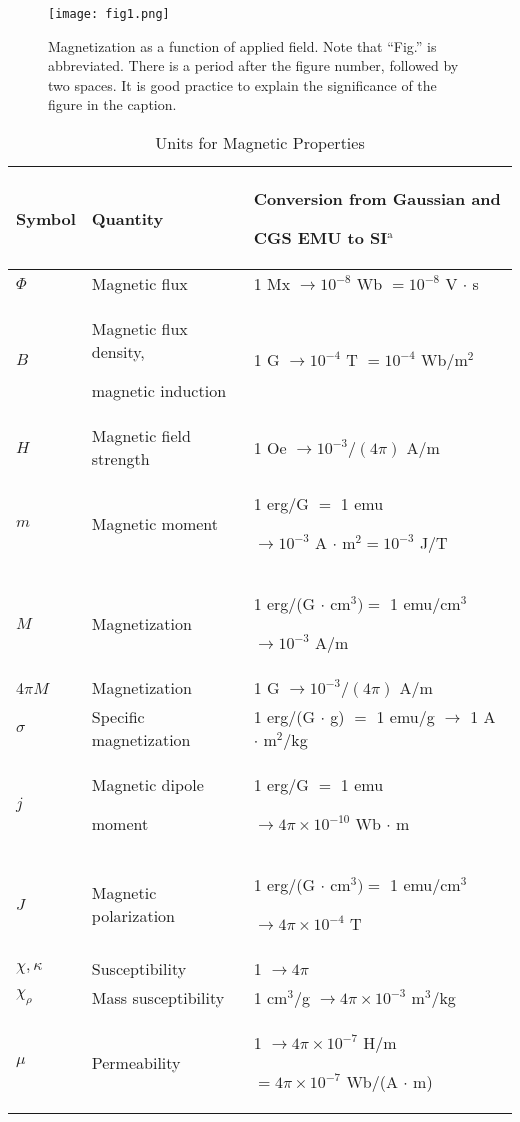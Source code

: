 \begin{figure}
\centerline{\texttt{[image: fig1.png]}}
\caption{Magnetization as a function of applied field. Note that ``Fig.'' is abbreviated. There is a period after the figure number, followed by two spaces. It is good practice to explain the significance of the figure in the caption.}
\end{figure}

\begin{table}
\caption{Units for Magnetic Properties}
\label{table}
\small
\setlength{\tabcolsep}{3pt}
\begin{tabular}{|p{25pt}|p{75pt}|p{110pt}|}
\hline
Symbol& 
Quantity& 
Conversion from Gaussian and \par CGS EMU to SI$^{\mathrm{a}}$ \\
\hline
$\Phi $& 
Magnetic flux& 
1 Mx $\to  10^{-8}$ Wb $= 10^{-8}$ V $\cdot$ s \\
$B$& 
Magnetic flux density, \par magnetic induction& 
1 G $\to  10^{-4}$ T $= 10^{-4}$ Wb/m$^{2}$ \\
$H$& 
Magnetic field strength& 
1 Oe $\to  10^{-3}/(4\pi )$ A/m \\
$m$& 
Magnetic moment& 
1 erg/G $=$ 1 emu \par $\to 10^{-3}$ A $\cdot$ m$^{2} = 10^{-3}$ J/T \\
$M$& 
Magnetization& 
1 erg/(G $\cdot$ cm$^{3}) =$ 1 emu/cm$^{3}$ \par $\to 10^{-3}$ A/m \\
4$\pi M$& 
Magnetization& 
1 G $\to  10^{-3}/(4\pi )$ A/m \\
$\sigma $& 
Specific magnetization& 
1 erg/(G $\cdot$ g) $=$ 1 emu/g $\to $ 1 A $\cdot$ m$^{2}$/kg \\
$j$& 
Magnetic dipole \par moment& 
1 erg/G $=$ 1 emu \par $\to 4\pi \times  10^{-10}$ Wb $\cdot$ m \\
$J$& 
Magnetic polarization& 
1 erg/(G $\cdot$ cm$^{3}) =$ 1 emu/cm$^{3}$ \par $\to 4\pi \times  10^{-4}$ T \\
$\chi , \kappa $& 
Susceptibility& 
1 $\to  4\pi $ \\
$\chi_{\rho }$& 
Mass susceptibility& 
1 cm$^{3}$/g $\to  4\pi \times  10^{-3}$ m$^{3}$/kg \\
$\mu $& 
Permeability& 
1 $\to  4\pi \times  10^{-7}$ H/m \par $= 4\pi \times  10^{-7}$ Wb/(A $\cdot$ m) \\

\end{tabular}
\end{table}

